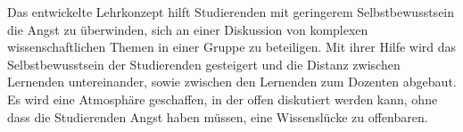 \begin{frame}
Das entwickelte Lehrkonzept hilft Studierenden mit geringerem Selbstbewusstsein die Angst zu
überwinden, sich an einer Diskussion von komplexen wissenschaftlichen Themen in einer Gruppe zu
beteiligen. Mit ihrer Hilfe wird das Selbstbewusstsein der Studierenden gesteigert und die Distanz zwischen Lernenden untereinander, sowie zwischen den Lernenden zum Dozenten abgebaut. Es wird eine Atmosphäre geschaffen, in der offen diskutiert werden kann, ohne dass die Studierenden Angst haben müssen, eine Wissenslücke zu offenbaren.
\end{frame}